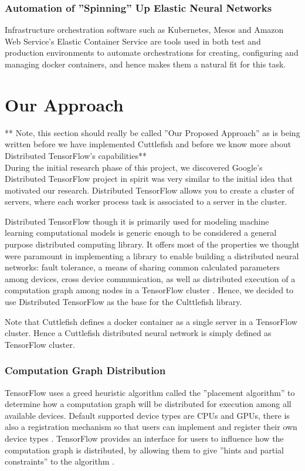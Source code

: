 \documentclass[conference]{IEEEtran}
\begin{document}
\subsubsection{Automation of ''Spinning'' Up Elastic Neural Networks}
Infrastructure orchestration software such as Kubernetes, Mesos and Amazon Web Service's Elastic Container Service are tools used in both test and production environments to automate orchestrations for creating, configuring and managing docker containers, and hence makes them a natural fit for this task.

\section{Our Approach}

** Note, this section should really be called ''Our Proposed Approach'' as is being written before we have implemented Cuttlefish and before we know more about Distributed TensorFlow's capabilities**\\

During the initial research phase of this project, we discovered Google's Distributed TensorFlow project in spirit was very similar to the initial idea that motivated our research.  Distributed TensorFlow allows you to create a cluster of servers, where each worker process task is associated to a server in the cluster.

Distributed TensorFlow though it is primarily used for modeling machine learning computational models is generic enough to be considered a general purpose distributed computing library. It offers most of the properties we thought were paramount in implementing a library to enable building a distributed neural networks: fault  tolerance, a means of sharing common calculated parameters among devices, cross device communication, as well as distributed execution of a computation graph among nodes in a TensorFlow cluster \cite{dist-tensorflow}.  Hence, we decided to use Distributed TensorFlow as the base for the Culttlefish library.

Note that Cuttlefish defines a docker container as a single server in a TensorFlow cluster. Hence a Cuttlefish distributed neural network is simply defined as TensorFlow cluster.

\subsubsection{Computation Graph Distribution}
TensorFlow uses a greed heuristic algorithm called the ''placement algorithm'' \cite{tensor-flow-white} to determine how a computation graph will be distributed for execution among all available devices. Default supported device types are CPUs and GPUs, there is  also a registration mechanism so that users can implement and register their own device types \cite{tensor-flow-white}. TensorFlow provides an interface for users to influence how the computation graph is distributed, by allowing them to give ''hints and partial constraints'' to the algorithm \cite{tensor-flow-white}. 
\end{document}
